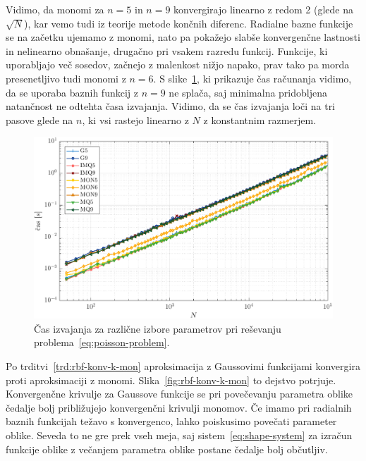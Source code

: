 \documentclass[12pt,a4paper,twoside]{article}
\theoremstyle{definition} %
\theoremstyle{plain} %
\numberwithin{equation}{section}
\newlength{\iw}
\begin{document}
Vidimo, da monomi za $n=5$ in $n=9$ konvergirajo linearno z redom 2 (glede na $\sqrt{N}$), kar
vemo tudi iz teorije metode končnih diferenc. Radialne bazne funkcije se na začetku ujemamo z monomi,
nato pa pokažejo slabše konvergenčne lastnosti in nelinearno obnašanje, drugačno pri vsakem razredu
funkcij. Funkcije, ki uporabljajo več sosedov, začnejo z malenkost nižjo napako, prav tako pa morda
presenetljivo tudi monomi z $n=6$. S slike~\ref{fig:poisson-square-time}, ki prikazuje čas računanja
vidimo, da se uporaba baznih funkcij z $n = 9$ ne splača, saj minimalna pridobljena natančnost ne
odtehta časa izvajanja.  Vidimo, da se čas izvajanja loči na tri pasove glede na $n$, ki vsi rastejo
linearno z $N$ z konstantnim razmerjem.

\begin{figure}[h]
  \centering
  \includegraphics[width=\iw]{images/poisson_square_time.pdf}
  \caption[Čas izvajanja MLSM pri reševanju Poissonove enačbe]{Čas izvajanja za
  različne izbore parametrov pri reševanju
problema~\eqref{eq:poisson-problem}.}
  \label{fig:poisson-square-time}
\end{figure}

Po trditvi~\ref{trd:rbf-konv-k-mon} aproksimacija z Gaussovimi funkcijami konvergira proti
aproksimaciji z monomi. Slika~\ref{fig:rbf-konv-k-mon} to dejstvo potrjuje. Konvergenčne krivulje za
Gaussove funkcije se pri povečevanju parametra oblike čedalje bolj približujejo konvergenčni
krivulji monomov. Če imamo pri radialnih baznih funkcijah težavo s konvergenco, lahko poiskusimo
povečati parameter oblike. Seveda to ne gre prek vseh meja, saj sistem~\eqref{eq:shape-system} za
izračun funkcije oblike z večanjem parametra oblike postane čedalje bolj občutljiv.
\end{document}
